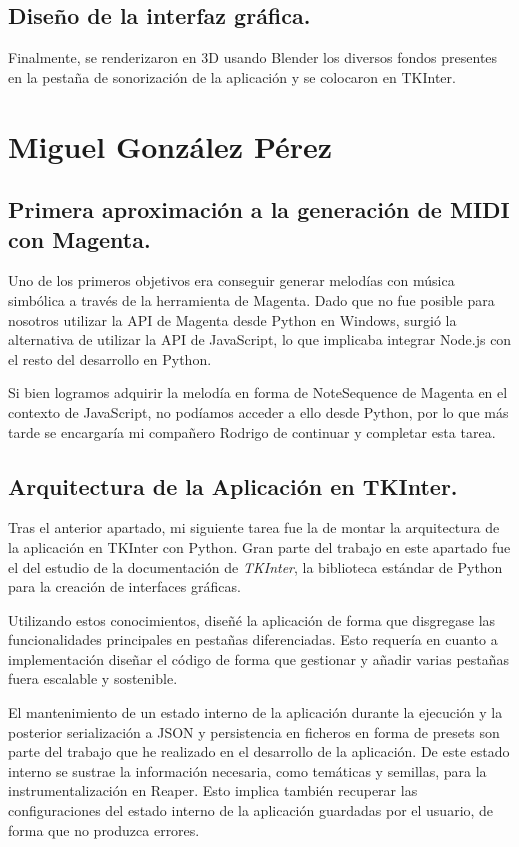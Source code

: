 \subsection*{Diseño de la interfaz gráfica.}
Finalmente, se renderizaron en 3D usando Blender los diversos fondos presentes en la pestaña de sonorización de la aplicación y se colocaron en TKInter.


\section*{Miguel González Pérez}

\subsection*{Primera aproximación a la generación de MIDI con Magenta.}
Uno de los primeros objetivos era conseguir generar melodías con música simbólica a través de la herramienta de Magenta. Dado que no fue posible para nosotros utilizar la API de Magenta desde Python en Windows, surgió la alternativa de utilizar la API de JavaScript, lo que implicaba integrar Node.js con el resto del desarrollo en Python. 

Si bien logramos adquirir la melodía en forma de NoteSequence de Magenta en el contexto de JavaScript, no podíamos acceder a ello desde Python, por lo que más tarde se encargaría mi compañero Rodrigo de continuar y completar esta tarea.

\subsection*{Arquitectura de la Aplicación en TKInter.}
Tras el anterior apartado, mi siguiente tarea fue la de montar la arquitectura de la aplicación en TKInter con Python. Gran parte del trabajo en este apartado fue el del estudio de la documentación de \textit{TKInter}, la biblioteca estándar de Python para la creación de interfaces gráficas. 

Utilizando estos conocimientos, diseñé la aplicación de forma que disgregase las funcionalidades principales en pestañas diferenciadas. Esto requería en cuanto a implementación diseñar el código de forma que gestionar y añadir varias pestañas fuera escalable y sostenible.

El mantenimiento de un estado interno de la aplicación durante la ejecución y la posterior serialización a JSON y persistencia en ficheros en forma de presets son parte del trabajo que he realizado en el desarrollo de la aplicación. De este estado interno se sustrae la información necesaria, como temáticas y semillas, para la instrumentalización en Reaper. Esto implica también recuperar las configuraciones del estado interno de la aplicación guardadas por el usuario, de forma que no produzca errores.

